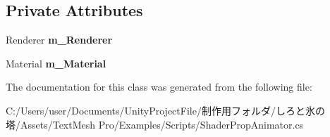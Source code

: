 \subsection*{Private Attributes}
\begin{DoxyCompactItemize}
\item 
\mbox{\label{class_t_m_pro_1_1_examples_1_1_shader_prop_animator_ab352d356a9ac0b0d624dbb0ac710c20c}} 
Renderer {\bfseries m\+\_\+\+Renderer}
\item 
\mbox{\label{class_t_m_pro_1_1_examples_1_1_shader_prop_animator_addbb1235d17334b54f2a84ac80462542}} 
Material {\bfseries m\+\_\+\+Material}
\end{DoxyCompactItemize}


The documentation for this class was generated from the following file\+:\begin{DoxyCompactItemize}
\item 
C\+:/\+Users/user/\+Documents/\+Unity\+Project\+File/制作用フォルダ/しろと氷の塔/\+Assets/\+Text\+Mesh Pro/\+Examples/\+Scripts/Shader\+Prop\+Animator.\+cs\end{DoxyCompactItemize}
